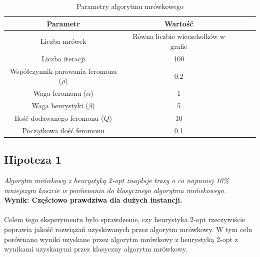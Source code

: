 \documentclass{article}
\begin{document}
\begin{table}[H]
    \label{tab:params}
    \centering
    \begin{tabular}{|c|c|c|c|c|}
        \hline
        \textbf{Parametr} & \textbf{Wartość} \\
        \hline
        Liczba mrówek & Równa liczbie wierzchołków w grafie \\
        \hline
        Liczba iteracji & 100 \\
        \hline
        Współczynnik parowania feromonu ($\rho$) & 0.2 \\
        \hline
        Waga feromonu ($\alpha$) & 1 \\
        \hline
        Waga heurystyki ($\beta$) & 5 \\
        \hline
        Ilość dodawanego feromonu ($Q$) & 10 \\
        \hline
        Początkowa ilość feromonu & 0.1 \\
        \hline
    \end{tabular}
    \caption{Parametry algorytmu mrówkowego}
    \label{tab:params}
\end{table}

\subsection{Hipoteza 1}
\textit{Algorytm mrówkowy z heurystyką 2-opt znajduje trasy o co najmniej 10\% mniejszym koszcie w porównaniu do klasycznego algorytmu mrówkowego.}
\\
\textbf{Wynik: Częściowo prawdziwa dla dużych instancji.} 
\\ \\
Celem tego eksperymentu było sprawdzenie, czy heurystyka 2-opt rzeczywiście poprawia jakość rozwiązań uzyskiwanych przez algorytm mrówkowy. W tym celu porównano wyniki uzyskane przez algorytm mrówkowy z heurystyką 2-opt z wynikami uzyskanymi przez klasyczny algorytm mrówkowy.
\end{document}

